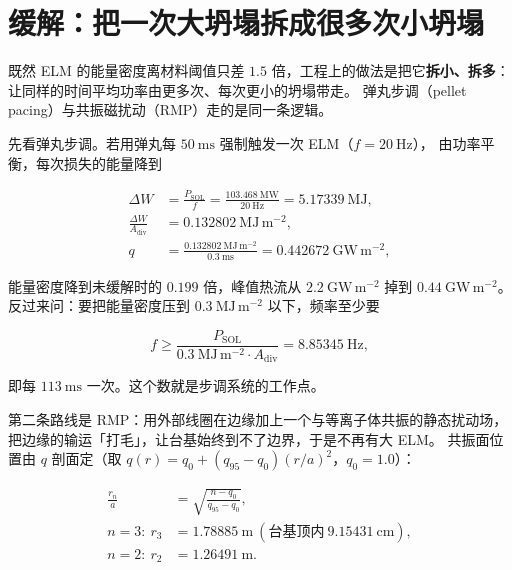 \section{缓解：把一次大坍塌拆成很多次小坍塌}
\label{sec:app-ad-mitigation}

既然 ELM 的能量密度离材料阈值只差 $1.5$ 倍，工程上的做法是把它\textbf{拆小、拆多}：
让同样的时间平均功率由更多次、每次更小的坍塌带走。
弹丸步调（pellet pacing）与共振磁扰动（RMP）走的是同一条逻辑。

先看弹丸步调。若用弹丸每 $50\ \mathrm{ms}$ 强制触发一次 ELM（$f=20\ \mathrm{Hz}$），
由功率平衡，每次损失的能量降到

\begin{equation}
\begin{aligned}
\Delta W&=\frac{P_{\mathrm{SOL}}}{f}=\frac{103.468\ \mathrm{MW}}{20\ \mathrm{Hz}}
=5.17339\ \mathrm{MJ},\\
\frac{\Delta W}{A_{\mathrm{div}}}&=0.132802\ \mathrm{MJ\,m^{-2}},\\
q&=\frac{0.132802\ \mathrm{MJ\,m^{-2}}}{0.3\ \mathrm{ms}}=0.442672\ \mathrm{GW\,m^{-2}},
\end{aligned}
\label{eq:app-ad-pace}
\end{equation}

能量密度降到未缓解时的 $0.199$ 倍，峰值热流从 $2.2\ \mathrm{GW\,m^{-2}}$ 掉到 $0.44\ \mathrm{GW\,m^{-2}}$。
反过来问：要把能量密度压到 $0.3\ \mathrm{MJ\,m^{-2}}$ 以下，频率至少要

\begin{equation}
f\ge\frac{P_{\mathrm{SOL}}}{0.3\ \mathrm{MJ\,m^{-2}}\cdot A_{\mathrm{div}}}
=8.85345\ \mathrm{Hz},
\label{eq:app-ad-fmin}
\end{equation}

即每 $113\ \mathrm{ms}$ 一次。这个数就是步调系统的工作点。

第二条路线是 RMP：用外部线圈在边缘加上一个与等离子体共振的静态扰动场，
把边缘的输运「打毛」，让台基始终到不了边界，于是不再有大 ELM。
共振面位置由 $q$ 剖面定（取 $q(r)=q_0+(q_{95}-q_0)(r/a)^2$，$q_0=1.0$）：

\begin{equation}
\begin{aligned}
\frac{r_n}{a}&=\sqrt{\frac{n-q_0}{q_{95}-q_0}},\\
n=3:\ r_3&=1.78885\ \mathrm{m}\ (\text{台基顶内}\ 9.15431\ \mathrm{cm}),\\
n=2:\ r_2&=1.26491\ \mathrm{m}.
\end{aligned}
\label{eq:app-ad-rmp}
\end{equation}

